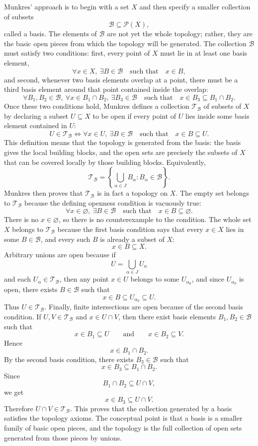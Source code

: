\documentclass{article}
\begin{document}
	Munkres' approach is to begin with a set \(X\) and then specify a smaller collection of subsets
	\[
	\mathcal B\subseteq\mathcal P(X),
	\]
	called a basis. The elements of \(\mathcal B\) are not yet the whole topology; rather, they are the basic open pieces from which the topology will be generated. The collection \(\mathcal B\) must satisfy two conditions: first, every point of \(X\) must lie in at least one basis element,
	\[
	\forall x\in X,\ \exists B\in\mathcal B
	\quad\text{such that}\quad
	x\in B,
	\]
	and second, whenever two basis elements overlap at a point, there must be a third basis element around that point contained inside the overlap:
	\[
	\forall B_1,B_2\in\mathcal B,\ \forall x\in B_1\cap B_2,\ 
	\exists B_3\in\mathcal B
	\quad\text{such that}\quad
	x\in B_3\subseteq B_1\cap B_2.
	\]
	Once these two conditions hold, Munkres defines a collection \(\mathcal T_{\mathcal B}\) of subsets of \(X\) by declaring a subset \(U\subseteq X\) to be open if every point of \(U\) lies inside some basis element contained in \(U\):
	\[
	U\in\mathcal T_{\mathcal B}
	\iff
	\forall x\in U,\ \exists B\in\mathcal B
	\quad\text{such that}\quad
	x\in B\subseteq U.
	\]
	This definition means that the topology is generated from the basis: the basis gives the local building blocks, and the open sets are precisely the subsets of \(X\) that can be covered locally by those building blocks. Equivalently,
	\[
	\mathcal T_{\mathcal B}
	=
	\left\{
	\bigcup_{\alpha\in J}B_\alpha:
	B_\alpha\in\mathcal B
	\right\}.
	\]
	Munkres then proves that \(\mathcal T_{\mathcal B}\) is in fact a topology on \(X\). The empty set belongs to \(\mathcal T_{\mathcal B}\) because the defining openness condition is vacuously true:
	\[
	\forall x\in\varnothing,\ \exists B\in\mathcal B
	\quad\text{such that}\quad
	x\in B\subseteq\varnothing.
	\]
	There is no \(x\in\varnothing\), so there is no counterexample to the condition. The whole set \(X\) belongs to \(\mathcal T_{\mathcal B}\) because the first basis condition says that every \(x\in X\) lies in some \(B\in\mathcal B\), and every such \(B\) is already a subset of \(X\):
	\[
	x\in B\subseteq X.
	\]
	Arbitrary unions are open because if
	\[
	U=\bigcup_{\alpha\in J}U_\alpha
	\]
	and each \(U_\alpha\in\mathcal T_{\mathcal B}\), then any point \(x\in U\) belongs to some \(U_{\alpha_0}\), and since \(U_{\alpha_0}\) is open, there exists \(B\in\mathcal B\) such that
	\[
	x\in B\subseteq U_{\alpha_0}\subseteq U.
	\]
	Thus \(U\in\mathcal T_{\mathcal B}\). Finally, finite intersections are open because of the second basis condition. If \(U,V\in\mathcal T_{\mathcal B}\) and \(x\in U\cap V\), then there exist basis elements \(B_1,B_2\in\mathcal B\) such that
	\[
	x\in B_1\subseteq U
	\qquad\text{and}\qquad
	x\in B_2\subseteq V.
	\]
	Hence
	\[
	x\in B_1\cap B_2.
	\]
	By the second basis condition, there exists \(B_3\in\mathcal B\) such that
	\[
	x\in B_3\subseteq B_1\cap B_2.
	\]
	Since
	\[
	B_1\cap B_2\subseteq U\cap V,
	\]
	we get
	\[
	x\in B_3\subseteq U\cap V.
	\]
	Therefore \(U\cap V\in\mathcal T_{\mathcal B}\). This proves that the collection generated by a basis satisfies the topology axioms. The conceptual point is that a basis is a smaller family of basic open pieces, and the topology is the full collection of open sets generated from those pieces by unions.
	
\end{document}
